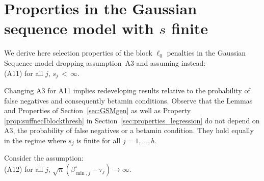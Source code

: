 \documentclass[aos]{imsart}
\theoremstyle{plain}
\begin{document}
\section{Properties in the Gaussian sequence model with $s$ finite}\label{sec:appendixGSMsfinite}

We derive here selection properties of the block $\ell_0$ penalties in the Gaussian Sequence model dropping assumption~A3 and assuming instead:\\
(A11) \quad for all $j$, \;$s_j \,< \, \infty$.

Changing A3 for A11 implies redeveloping results relative to the probability of false negatives and consequently betamin conditions. Observe that the Lemmas and Properties of Section~\ref{sec:GSMgen} as well as Property \ref{prop:suffnecIblockthresh} in Section~\ref{sec:properties_legression} do not depend on A3, the probability of false negatives or a betamin condition. They hold equally in the regime where $s_j$ is finite for all $j=1,\ldots,b$.

Consider the assumption:\\

(A12) \quad for all $j$, \; $\sqrt{n}(\beta_{\min,j}^{\star}-\tau_j) \to \infty$.\\
\end{document}
